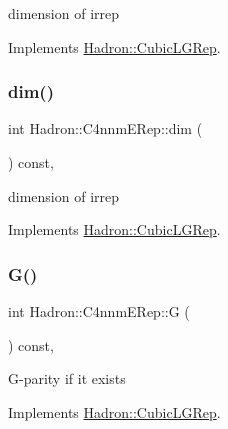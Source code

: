 dimension of irrep 

Implements \mbox{\hyperlink{structHadron_1_1CubicLGRep_a3acbaea26503ed64f20df693a48e4cdd}{Hadron\+::\+Cubic\+L\+G\+Rep}}.

\mbox{\label{structHadron_1_1C4nnmERep_ae5381e6e188b515505fbd5d6a7c6e7c9}} 
\subsubsection{\texorpdfstring{dim()}{dim()}\hspace{0.1cm}{\footnotesize\ttfamily [3/3]}}
{\footnotesize\ttfamily int Hadron\+::\+C4nnm\+E\+Rep\+::dim (\begin{DoxyParamCaption}{ }\end{DoxyParamCaption}) const\hspace{0.3cm}{\ttfamily [inline]}, {\ttfamily [virtual]}}

dimension of irrep 

Implements \mbox{\hyperlink{structHadron_1_1CubicLGRep_a3acbaea26503ed64f20df693a48e4cdd}{Hadron\+::\+Cubic\+L\+G\+Rep}}.

\mbox{\label{structHadron_1_1C4nnmERep_aeebb3eed0a37633aded692d6d5929f84}} 
\subsubsection{\texorpdfstring{G()}{G()}\hspace{0.1cm}{\footnotesize\ttfamily [1/3]}}
{\footnotesize\ttfamily int Hadron\+::\+C4nnm\+E\+Rep\+::G (\begin{DoxyParamCaption}{ }\end{DoxyParamCaption}) const\hspace{0.3cm}{\ttfamily [inline]}, {\ttfamily [virtual]}}

G-\/parity if it exists 

Implements \mbox{\hyperlink{structHadron_1_1CubicLGRep_ace26f7b2d55e3a668a14cb9026da5231}{Hadron\+::\+Cubic\+L\+G\+Rep}}.

\mbox{\label{structHadron_1_1C4nnmERep_aeebb3eed0a37633aded692d6d5929f84}} 
